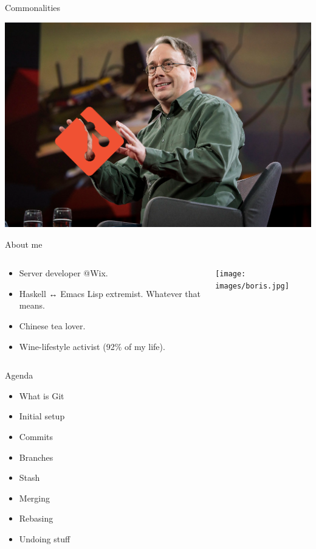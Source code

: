 \documentclass[presentation,aspectratio=169,smaller]{beamer}
\begin{document}
\begin{frame}[label={sec:org1244901}]{Commonalities}
\begin{center}
\includegraphics[width=.9\linewidth]{images/torvalds.png}
\end{center}
\end{frame}

\begin{frame}[label={sec:org28e5190}]{About me}
\begin{columns}
\begin{column}{0.75\columnwidth}
\begin{itemize}
\item Server developer @Wix.
\item Haskell ↔ Emacs Lisp extremist. Whatever that means.
\item Chinese tea lover.
\item Wine-lifestyle activist (92\% of my life).
\end{itemize}
\end{column}

\begin{column}{0.25\columnwidth}
\begin{center}
\texttt{[image: images/boris.jpg]}
\end{center}
\end{column}
\end{columns}
\end{frame}

\begin{frame}[label={sec:orgca57c1b}]{Agenda}
\begin{itemize}
\item What is Git
\item Initial setup
\item Commits
\item Branches
\item Stash
\item Merging
\item Rebasing
\item Undoing stuff
\end{itemize}
\end{frame}
\end{document}
